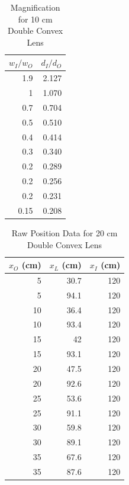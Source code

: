 \begin{table}[ht]
    \centering
    \begin{tabular}{|r|r|}
        \hline
        $w_{I} / w_{O}$ & $d_{I} / d_{O}$ \\
        \hline
        1.9 & 2.127 \\
        1 & 1.070 \\
        0.7 & 0.704 \\
        0.5 & 0.510 \\
        0.4 & 0.414 \\
        0.3 & 0.340 \\
        0.2 & 0.289 \\
        0.2 & 0.256 \\
        0.2 & 0.231 \\
        0.15 & 0.208 \\
        \hline
    \end{tabular}
    \caption{Magnification for 10 cm Double Convex Lens}
    \label{table.08.magnification.10cm}
\end{table}
\begin{table}[ht!]
    \centering
    \begin{tabular}{|r|r|r|}
        \hline
        $x_{O}$ (cm) & $x_{L}$ (cm) & $x_{I}$ (cm) \\
        \hline
        5 & 30.7 & 120 \\
        5 & 94.1 & 120 \\
        10 & 36.4 & 120 \\
        10 & 93.4 & 120 \\
        15 & 42 & 120 \\
        15 & 93.1 & 120 \\
        20 & 47.5 & 120 \\
        20 & 92.6 & 120 \\
        25 & 53.6 & 120 \\
        25 & 91.1 & 120 \\
        30 & 59.8 & 120 \\
        30 & 89.1 & 120 \\
        35 & 67.6 & 120 \\
        35 & 87.6 & 120 \\
        \hline
        \end{tabular}
    \caption{Raw Position Data for 20 cm Double Convex Lens}
    \label{table.08.position.20cm}
\end{table}
